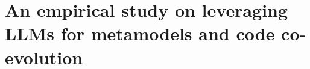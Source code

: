 
\chapter{An empirical study on leveraging LLMs for metamodels and code co-evolution}
\label{chapitre3}
